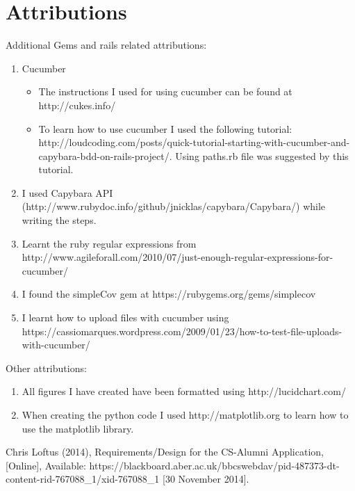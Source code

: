 \documentclass[10pt,a4paper,titlepage]{article}
\begin{document}
\section{Attributions}

Additional Gems and rails related attributions:
\begin{enumerate}
\item Cucumber
\begin{itemize}
\item The instructions I used for using cucumber can be found at http://cukes.info/
\item To learn how to use cucumber I used the following tutorial: http://loudcoding.com/posts/quick-tutorial-starting-with-cucumber-and-capybara-bdd-on-rails-project/. Using paths.rb file was suggested by this tutorial.
\end{itemize}
\item I used Capybara API (http://www.rubydoc.info/github/jnicklas/capybara/Capybara/) while writing the steps.
\item Learnt the ruby regular expressions from http://www.agileforall.com/2010/07/just-enough-regular-expressions-for-cucumber/
\item I found the simpleCov gem at https://rubygems.org/gems/simplecov
\item I learnt how to upload files with cucumber using https://cassiomarques.wordpress.com/2009/01/23/how-to-test-file-uploads-with-cucumber/
\end{enumerate}

Other attributions:
	\begin{enumerate}
	\item All figures I have created have been formatted using http://lucidchart.com/ 
	\item When creating the python code I used http://matplotlib.org to learn how to use the matplotlib library.
	\end{enumerate}


\begin{thebibliography}{1}

Chris Loftus (2014), Requirements/Design for the CS-Alumni Application, [Online], Available: https://blackboard.aber.ac.uk/bbcswebdav/pid-487373-dt-content-rid-767088\_1/xid-767088\_1 [30 November 2014].



\end{thebibliography}
\end{document}

